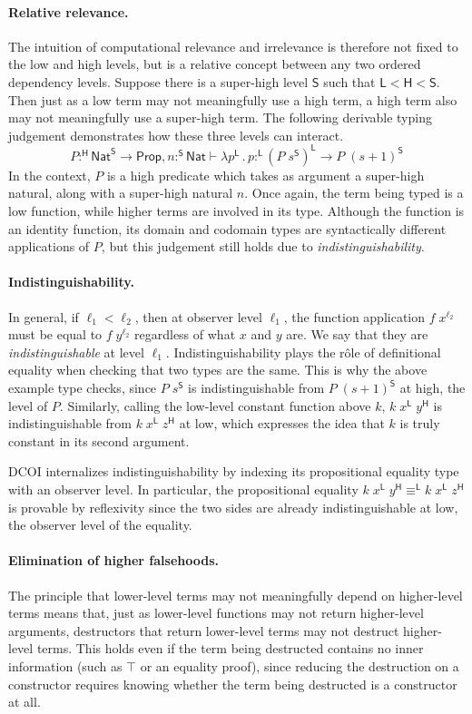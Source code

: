\documentclass{article}
\newcommand{\kw}[1]{\mathsf{#1}}
\newcommand{\HH}{\mathsf{H}}
\newcommand{\LL}{\mathsf{L}}
\renewcommand{\SS}{\mathsf{S}}
\begin{document}
\paragraph{Relative relevance.}
The intuition of computational relevance and irrelevance
is therefore not fixed to the low and high levels,
but is a relative concept between any two ordered dependency levels.
Suppose there is a super-high level $\SS$ such that $\LL < \HH < \SS$.
Then just as a low term may not meaningfully use a high term,
a high term also may not meaningfully use a super-high term.
The following derivable typing judgement demonstrates
how these three levels can interact.
$$P :^\HH \kw{Nat}^\SS \to \kw{Prop}, n :^\SS \kw{Nat} \vdash \lambda p^\LL \mathpunct{.} p :^\LL
  (P \; s^\SS)^\LL \to P \; (s + 1)^\SS$$
In the context, $P$ is a high predicate which takes as argument a super-high natural,
along with a super-high natural $n$.
Once again, the term being typed is a low function,
while higher terms are involved in its type.
Although the function is an identity function,
its domain and codomain types are syntactically different applications of $P$,
but this judgement still holds due to \emph{indistinguishability}.

\paragraph{Indistinguishability.}
In general, if $\ell_1 < \ell_2$, then at observer level $\ell_1$,
the function application $f \; x^{\ell_2}$ must be equal
to $f \; y^{\ell_2}$ regardless of what $x$ and $y$ are.
We say that they are \emph{indistinguishable} at level $\ell_1$.
Indistinguishability plays the r\^ole of definitional equality
when checking that two types are the same.
This is why the above example type checks,
since $P \; s^\SS$ is indistinguishable from $P \; (s + 1)^\SS$ at high,
the level of $P$.
Similarly, calling the low-level constant function above $k$,
$k \; x^\LL \; y^\HH$ is indistinguishable from $k \; x^\LL \; z^\HH$ at low,
which expresses the idea that $k$ is truly constant in its second argument.

DCOI internalizes indistinguishability by indexing
its propositional equality type with an observer level.
In particular, the propositional equality
$k \; x^\LL \; y^\HH \equiv^\LL k \; x^\LL \; z^\HH$
is provable by reflexivity since the two sides are already indistinguishable
at low, the observer level of the equality.

\paragraph{Elimination of higher falsehoods.}
The principle that lower-level terms may not meaningfully depend
on higher-level terms means that,
just as lower-level functions may not return higher-level arguments,
destructors that return lower-level terms may not destruct higher-level terms.
This holds even if the term being destructed contains no inner information
(such as $\top$ or an equality proof),
since reducing the destruction on a constructor requires knowing
whether the term being destructed is a constructor at all.
\end{document}
